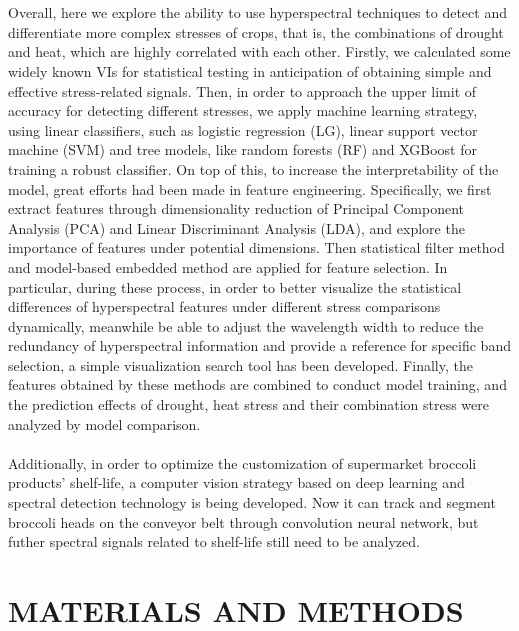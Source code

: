 \documentclass[12pt,a4paper]{article}
\begin{document}
\\
\\
Overall, here we explore the ability to use hyperspectral techniques to detect and differentiate more complex stresses of crops, that is, the combinations of drought and heat, which are highly correlated with each other. Firstly, we calculated some widely known VIs for statistical testing in anticipation of obtaining simple and effective stress-related signals. Then, in order to approach the upper limit of accuracy for detecting different stresses, we apply machine learning strategy, using linear classifiers, such as logistic regression (LG), linear support vector machine (SVM) and tree models, like random forests (RF) and XGBoost for training a robust classifier. On top of this, to increase the interpretability of the model, great efforts had been made in feature engineering. Specifically, we first extract features through dimensionality reduction of Principal Component Analysis (PCA) and Linear Discriminant Analysis (LDA), and explore the importance of features under potential dimensions. Then statistical filter method and model-based embedded method are applied for feature selection. In particular, during these process, in order to better visualize the statistical differences of hyperspectral features under different stress comparisons dynamically, meanwhile be able to adjust the wavelength width to reduce the redundancy of hyperspectral information and provide a reference for specific band selection, a simple visualization search tool has been developed. Finally, the features obtained by these methods are combined to conduct model training, and the prediction effects of drought, heat stress and their combination stress were analyzed by model comparison.
\\
\\
Additionally, in order to optimize the customization of supermarket broccoli products' shelf-life, a computer vision strategy based on deep learning and spectral detection technology is being developed. Now it can track and segment broccoli heads on the conveyor belt through convolution neural network, but futher spectral signals related to shelf-life still need to be analyzed.

\section{MATERIALS AND METHODS}
\end{document}
